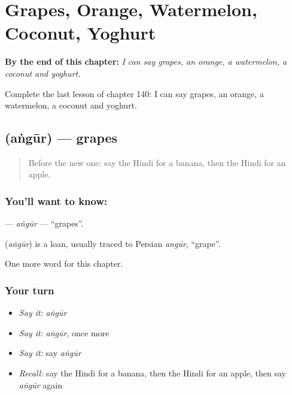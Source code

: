 
\chapter{Grapes, Orange, Watermelon, Coconut, Yoghurt}
\label{ch:hi-grapes-orange-watermelon-coconut-yoghurt}

\begin{chapteropening}
\textbf{By the end of this chapter:} \emph{I can say grapes, an orange, a watermelon, a coconut and yoghurt.}

Complete the last lesson of chapter 140: I can say grapes, an orange, a watermelon, a coconut and yoghurt.
\end{chapteropening}

\section[\texorpdfstring{\hi{अंगूर} (aṅgūr)}{अंगूर (aṅgūr)}]{ (aṅgūr) — grapes}

\label{lesson:HI-C140-angur}



\begin{quote}
Before the new one: say the Hindi for a banana, then the Hindi for an apple.
\end{quote}

\subsection*{You'll want to know: }
\textbf{} — \emph{aṅgūr} — \textquotedblleft{}grapes\textquotedblright{}.

\begin{cousinweb}
\textbf{} (\emph{aṅgūr}) is a loan, usually traced to Persian \emph{angūr}, \textquotedblleft{}grape\textquotedblright{}.
\end{cousinweb}

\begin{grammarlens}[title={What you've built}]
One more word for this chapter.
\end{grammarlens}

\subsection*{Your turn}
\begin{itemize}
\raggedright
  \item \emph{Say it:} \emph{aṅgūr}
  \item \emph{Say it:} \emph{aṅgūr}, once more
  \item \emph{Say it:} say \emph{aṅgūr}
  \item \emph{Recall:} say the Hindi for a banana, then the Hindi for an apple, then say \emph{aṅgūr} again
\end{itemize}

